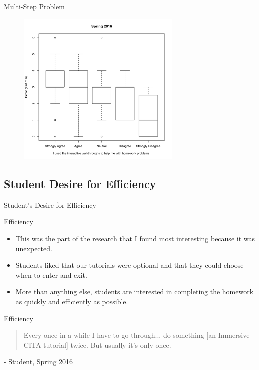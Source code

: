 \documentclass[xcolor=x11names,compress]{beamer}
\begin{document}
\begin{frame}{Multi-Step Problem}
	\begin{figure}
		\includegraphics[width=0.7\textwidth]{img/multi-step_vs_reported_use.pdf}
	\end{figure}
\end{frame}

\subsection{Student Desire for Efficiency}

\begin{frame}
	\begin{center}
		{\large Student's Desire for Efficiency}
	\end{center}
\end{frame}

\begin{frame}{Efficiency}
	\begin{itemize}
		\item This was the part of the research that I found most interesting because it was unexpected.
		\vspace{1mm}
		\item Students liked that our tutorials were optional and that they could choose when to enter and exit.
		\vspace{1mm}
		\item More than anything else, students are interested in completing the homework as quickly and efficiently as possible.
	\end{itemize}
\end{frame}

\begin{frame}{Efficiency}
	\begin{quote}
		Every once in a while I have to go through... do something [an Immersive CITA tutorial] twice. But usually it's only once.
	\end{quote}
	\vspace{5mm}
	- Student, Spring 2016
\end{frame}
\end{document}
